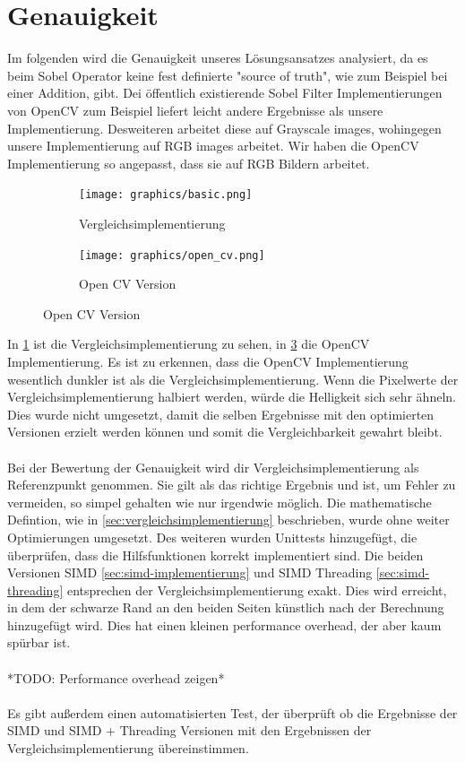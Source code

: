 \documentclass[course=erap]{aspdoc}
\begin{document}
\section{Genauigkeit}
Im folgenden wird die Genauigkeit unseres Lösungsansatzes analysiert, da es beim Sobel Operator keine fest definierte "source of truth", wie zum Beispiel bei einer Addition, gibt.
Dei öffentlich existierende Sobel Filter Implementierungen von OpenCV zum Beispiel liefert leicht andere Ergebnisse als unsere Implementierung.
Desweiteren arbeitet diese auf Grayscale images, wohingegen unsere Implementierung auf RGB images arbeitet. Wir haben die OpenCV Implementierung so angepasst, dass sie auf RGB Bildern arbeitet.
\begin{figure}[H]
    \begin{subfigure}{.5\columnwidth}
        \centering
        \texttt{[image: graphics/basic.png]}
        \caption{Vergleichsimplementierung}
        \label{fig:basic}
    \end{subfigure}
    \begin{subfigure}{.5\columnwidth}
        \centering
        \texttt{[image: graphics/open\_cv.png]}
        \caption{Open CV Version}
        \label{fig:opencv}
    \end{subfigure}
\end{figure}
In {\ref{fig:basic}} ist die Vergleichsimplementierung zu sehen, in {\ref{fig:opencv}} die OpenCV Implementierung.
Es ist zu erkennen, dass die OpenCV Implementierung wesentlich dunkler ist als die Vergleichsimplementierung.
Wenn die Pixelwerte der Vergleichsimplementierung halbiert werden, würde die Helligkeit sich sehr ähneln.
Dies wurde nicht umgesetzt, damit die selben Ergebnisse mit den optimierten Versionen erzielt werden können und somit die Vergleichbarkeit gewahrt bleibt. 
\\\\
Bei der Bewertung der Genauigkeit wird dir Vergleichsimplementierung als Referenzpunkt genommen. Sie gilt als das richtige Ergebnis und ist, um Fehler zu vermeiden, so simpel gehalten wie nur irgendwie möglich.
Die mathematische Defintion, wie in \ref{sec:vergleichsimplementierung} beschrieben, wurde ohne weiter Optimierungen umgesetzt.
Des weiteren wurden Unittests hinzugefügt, die überprüfen, dass die Hilfsfunktionen korrekt implementiert sind.
Die beiden Versionen SIMD \ref{sec:simd-implementierung} und SIMD Threading \ref{sec:simd-threading} entsprechen der Vergleichsimplementierung exakt.
Dies wird erreicht, in dem der schwarze Rand an den beiden Seiten künstlich nach der Berechnung hinzugefügt wird. Dies hat einen kleinen performance overhead, der aber kaum spürbar ist.
\\\\
*TODO: Performance overhead zeigen*
\\\\
Es gibt außerdem einen automatisierten Test, der überprüft ob die Ergebnisse der SIMD und SIMD + Threading Versionen mit den
Ergebnissen der Vergleichsimplementierung übereinstimmen.
\end{document}
